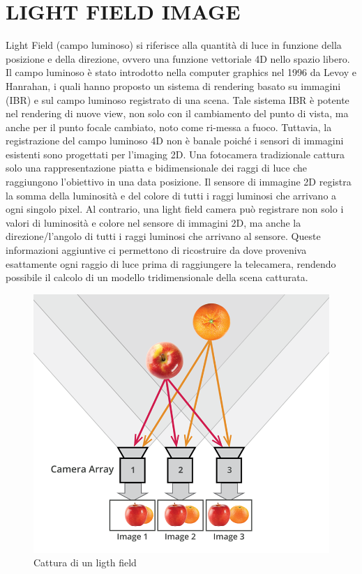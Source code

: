 \chapter{LIGHT FIELD IMAGE}
Light Field (campo luminoso) si riferisce alla quantità di luce in funzione della posizione e della direzione, ovvero una funzione vettoriale 4D nello spazio libero. Il campo luminoso  è stato introdotto nella computer graphics nel 1996 da Levoy e Hanrahan, i quali hanno proposto un sistema di rendering basato su immagini (IBR) e sul campo luminoso registrato di una scena. Tale sistema IBR è potente nel rendering di nuove view, non solo con il cambiamento del punto di vista, ma anche per il punto focale cambiato, noto come ri-messa a fuoco. Tuttavia, la registrazione del campo luminoso 4D non è banale poiché i sensori di immagini esistenti sono progettati per l'imaging 2D. Una fotocamera tradizionale cattura solo una rappresentazione piatta e bidimensionale dei raggi di luce che raggiungono l’obiettivo in una data posizione. Il sensore di immagine 2D registra la somma della luminosità e del colore di tutti i raggi luminosi che arrivano a ogni singolo pixel. Al contrario, una light field camera può registrare non solo i valori di luminosità e colore nel sensore di immagini 2D, ma anche la direzione/l’angolo di tutti i raggi luminosi che arrivano al sensore. Queste informazioni aggiuntive ci permettono di ricostruire da dove proveniva esattamente ogni raggio di luce prima di raggiungere la telecamera, rendendo possibile il calcolo di un modello tridimensionale della scena catturata. 
\begin{figure}[ht]
    \centering
    \includegraphics{img/what-is-a-light-field-disparity-recording-lytro.png}
    \caption{Cattura di un ligth field}
    \label{fig:ligthFieldRecording}
\end{figure}
